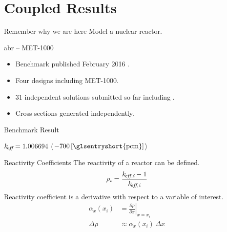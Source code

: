 \section{Coupled Results}
\label{sec:coupledResults}

\begin{frame}{Remember why we are here}
  \pause
  \huge Model a nuclear reactor.
\end{frame}

\begin{frame}{\gls{abr} -- MET-1000}
  \begin{itemize}
    \item Benchmark published February 2016 \cite{abr}.
    \item Four designs including MET-1000.
    \item 31 independent solutions submitted so far including \dif.
    \item Cross sections generated independently.
  \end{itemize}
\end{frame}

\begin{frame}{Benchmark Result}
  \vspace{-0.25in}
  \begin{figure}
    \centering
    \hspace{1in}
  \end{figure}
  \begin{block}{}
    \centering
    $k_{\!\mbox{\scriptsize \em eff}} =  1.006694 $ \qquad (\dif $-700\units{\glsentryshort{pcm}}$)
  \end{block}
\end{frame}

\begin{frame}{Reactivity Coefficients}
  The reactivity of a reactor can be defined.
  \begin{equation}
    \label{eq:reactivity}
    \rho_i = \frac{k_{\!\mbox{\scriptsize \em eff,{i}}} - 1}{k_{\!\mbox{\scriptsize \em eff,{i}}}}
  \end{equation}
  Reactivity coefficient is a derivative with respect to a variable of interest.
  \begin{align}
    \label{eq:reactivity_coefficient}
    \alpha_x(x_i) &= \left. \frac{\partial \rho}{\partial x} \right|_{x=x_i} \\
    \Delta \rho &\approx \alpha_x(x_i) \, \Delta x
  \end{align}
\end{frame}


